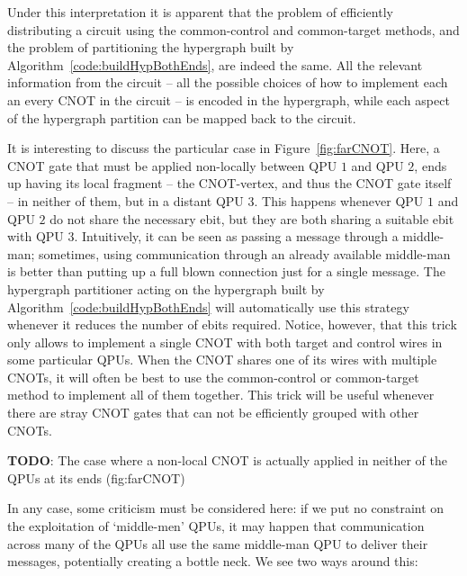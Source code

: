 Under this interpretation it is apparent that the problem of efficiently distributing a circuit using the common-control and common-target methods, and the problem of partitioning the hypergraph built by Algorithm~\ref{code:buildHypBothEnds}, are indeed the same. All the relevant information from the circuit -- all the possible choices of how to implement each an every CNOT in the circuit -- is encoded in the hypergraph, while each aspect of the hypergraph partition can be mapped back to the circuit.

It is interesting to discuss the particular case in Figure~\ref{fig:farCNOT}. Here, a CNOT gate that must be applied non-locally between QPU \(1\) and QPU \(2\), ends up having its local fragment -- the CNOT-vertex, and thus the CNOT gate itself --  in neither of them, but in a distant QPU \(3\). This happens whenever QPU \(1\) and QPU \(2\) do not share the necessary ebit, but they are both sharing a suitable ebit with QPU \(3\). Intuitively, it can be seen as passing a message through a middle-man; sometimes, using communication through an already available middle-man is better than putting up a full blown connection just for a single message. The hypergraph partitioner acting on the hypergraph built by Algorithm~\ref{code:buildHypBothEnds} will automatically use this strategy whenever it reduces the number of ebits required. Notice, however, that this trick only allows to implement a single CNOT with both target and control wires in some particular QPUs. When the CNOT shares one of its wires with multiple CNOTs, it will often be best to use the common-control or common-target method to implement all of them together. This trick will be useful whenever there are stray CNOT gates that can not be efficiently grouped with other CNOTs.

\textbf{TODO}: The case where a non-local CNOT is actually applied in neither of the QPUs at its ends (fig:farCNOT)

In any case, some criticism must be considered here: if we put no constraint on the exploitation of `middle-men' QPUs, it may happen that communication across many of the QPUs all use the same middle-man QPU to deliver their messages, potentially creating a bottle neck. We see two ways around this:

